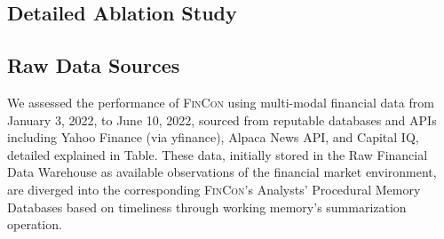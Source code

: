 \subsection{Detailed Ablation Study}
\label{ablation_study}



\newpage
\subsection{Raw Data Sources}
\label{appendix:data}
We assessed the performance of \textsc{FinCon} using multi-modal financial data from January 3, 2022, to June 10, 2022, sourced from reputable databases and APIs including Yahoo Finance (via yfinance), Alpaca News API, and Capital IQ, detailed explained in Table. These data, initially stored in the Raw Financial Data Warehouse as available observations of the financial market environment, are diverged into the corresponding \textsc{FinCon}'s Analysts' Procedural Memory Databases based on timeliness through working memory's summarization operation. 

